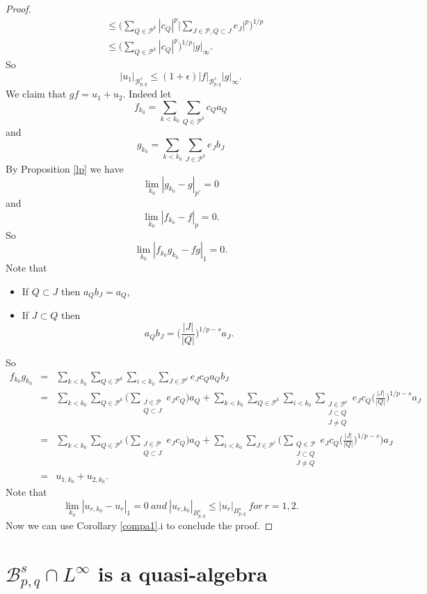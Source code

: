 \documentclass{amsart}
\theoremstyle{definition}
\begin{document}
\begin{proof}
\begin{align}
&\leq  \Big( \sum_{Q \in \mathcal{P}^k} |c_Q|^p \big| \sum_{J\in \mathcal{P}, Q\subset J} e_J \big|^p  \Big)^{1/p} \nonumber  \\
&\leq  \Big(  \sum_{Q \in \mathcal{P}^k} |c_Q|^p \Big)^{1/p} |g|_{\infty}. \nonumber  
\end{align} 
So
$$ |u_1|_{\mathcal{B}^s_{p,q}} \leq  (1+\epsilon) |f|_{\mathcal{B}^s_{p,q}} |g|_\infty .$$
We claim  that $gf= u_1+u_2$. Indeed  let
$$f_{k_0} = \sum_{k<k_0} \sum_{Q\in \mathcal{P}^k} c_Q a_Q$$
and
$$g_{k_0} = \sum_{k<k_0} \sum_{J\in \mathcal{P}^k} e_J b_J$$
By Proposition \ref{lp} we have 
$$\lim_{k_0} |g_{k_0}-g|_{p'}=0$$
and
 $$\lim_{k_0} |f_{k_0}-f|_{p}=0.$$
So
$$\lim_{k_0}|f_{k_0}g_{k_0}-fg|_1=0.$$
Note that 
\begin{itemize}
\item[A.] If $Q\subset J$ then  $a_Q b_J= a_Q$,
\item[B.] If $J \subset Q$ then 
$$a_Q b_J =  \big( \frac{|J|}{|Q|}\big)^{1/p-s} a_J.$$
\end{itemize}
So
\begin{eqnarray*}
f_{k_0}g_{k_0}&=& \sum_{k<k_0} \sum_{Q\in \mathcal{P}^k}  \sum_{i<k_0} \sum_{J\in \mathcal{P}^i} e_J c_Q a_Qb_J\\
&=&  \sum_{k<k_0} \sum_{Q\in \mathcal{P}^k}  \big( \sum_{\substack{J\in \mathcal{P}\\ Q\subset J}} e_Jc_Q\big)a_Q +  \sum_{k<k_0} \sum_{Q\in \mathcal{P}^k}  \sum_{i<k_0} \sum_{\substack{J\in \mathcal{P}^i\\J\subset Q\\J\neq Q}}  e_Jc_Q \big( \frac{|J|}{|Q|}\big)^{1/p-s} a_J \\
&=&  \sum_{k<k_0} \sum_{Q\in \mathcal{P}^k}  \big( \sum_{\substack{J\in \mathcal{P}\\ Q\subset J}} e_Jc_Q\big)a_Q +   \sum_{i<k_0} \sum_{J \in \mathcal{P}^i}  \Big(  \sum_{\substack{Q\in \mathcal{P}\\J\subset Q\\J\neq Q}}  e_Jc_Q \big( \frac{|J|}{|Q|}\big)^{1/p-s}\Big) a_J\\
&=&u_{1,k_0}+u_{2,k_0}.
\end{eqnarray*}
Note that  
$$\lim_{k_0} |u_{r,k_0}-u_r|_1=0 \ and \   |u_{r,k_0}|_{B^s_{p,q}}\leq |u_{r}|_{B^s_{p,q}} \ for \ r=1,2.$$
Now we can use Corollary \ref{compa1}.i to conclude the proof.
\end{proof}




\section{ $\mathcal{B}^s_{p,q}\cap L^\infty$ is a quasi-algebra}
\end{document}
